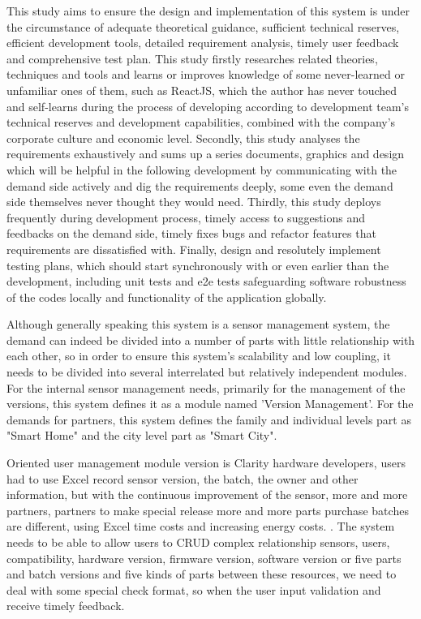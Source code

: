 This study aims to ensure the design and implementation of this system is under the circumstance of adequate theoretical guidance, sufficient technical reserves, efficient development tools, detailed requirement analysis, timely user feedback and comprehensive test plan. This study firstly researches related theories, techniques and tools and learns or improves knowledge of some never-learned or unfamiliar ones of them, such as ReactJS, which the author has never touched and self-learns during the process of developing according to development team's technical reserves and development capabilities, combined with the company's corporate culture and economic level. Secondly, this study analyses the requirements exhaustively and sums up a series documents, graphics and design which will be helpful in the following development by communicating with the demand side actively and dig the requirements deeply, some even the demand side themselves never thought they would need. Thirdly, this study deploys frequently during development process, timely access to suggestions and feedbacks on the demand side, timely fixes bugs and refactor features that requirements are dissatisfied with. Finally, design and resolutely implement testing plans, which should start synchronously with or even earlier than the development, including unit tests and e2e tests safeguarding software robustness of the codes locally and functionality of the application globally.

Although generally speaking this system is a sensor management system, the demand can indeed be divided into a number of parts with little relationship with each other, so in order to ensure this system's scalability and low coupling, it needs to be divided into several interrelated but relatively independent modules. For the internal sensor management needs, primarily for the management of the versions, this system defines it as a module named 'Version Management'. For the demands for partners, this system defines the family and individual levels part as "Smart Home" and the city level part as "Smart City".

Oriented user management module version is Clarity hardware developers, users had to use Excel record sensor version, the batch, the owner and other information, but with the continuous improvement of the sensor, more and more partners, partners to make special release more and more parts purchase batches are different, using Excel time costs and increasing energy costs.
. The system needs to be able to allow users to CRUD complex relationship sensors, users, compatibility, hardware version, firmware version, software version or five parts and batch versions and five kinds of parts between these resources, we need to deal with some special check format, so when the user input validation and receive timely feedback.

